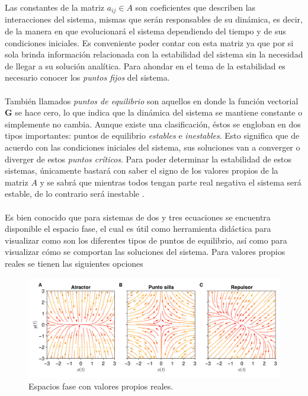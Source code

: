 Las constantes de la matriz $a_{ij}\in A$ son coeficientes que describen las interacciones del sistema, mismas que serán responsables de su dinámica, es decir, de la manera en que evolucionará el sistema dependiendo del tiempo y de sus condiciones iniciales. Es conveniente poder contar con esta matriz ya que por si sola brinda información relacionada con la estabilidad del sistema sin la necesidad de llegar a su solución analítica. Para ahondar en el tema de la estabilidad es necesario conocer los \textit{puntos fijos} del sistema.
\\
\\
También llamados \textit{puntos de equilibrio} son aquellos en donde la función vectorial $\textbf{G}$ se hace cero, lo que indica que la dinámica del sistema se mantiene constante o simplemente no cambia. Aunque existe una clasificación, éstos se engloban en dos tipos importantes: puntos de equilibrio \textit{estables} e \textit{inestables}. Esto significa que de acuerdo con las condiciones iniciales del sistema, sus soluciones van a converger o diverger de estos \textit{puntos críticos}. Para poder determinar la estabilidad de estos sistemas, únicamente bastará con saber el signo de los valores propios de la matriz $A$ y se sabrá que mientras todos tengan parte real negativa el sistema será estable, de lo contrario será inestable \cite{hirsch2013differential}.\\
\\
Es bien conocido que para sistemas de dos y tres ecuaciones se encuentra disponible el espacio fase, el cual es útil como herramienta didáctica para visualizar como son los diferentes tipos de puntos de equilibrio, así como para visualizar cómo se comportan las soluciones del sistema. Para valores propios reales se tienen las siguientes opciones
	\begin{figure}[h!]
	\centering
	\includegraphics[scale=0.23]{../Imagenes/Espacios fase reales}
	\caption{Espacios fase con valores propios reales.}
	\label{fig:EFReales}
\end{figure}


